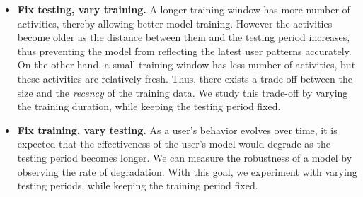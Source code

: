 \begin{itemize}
  \renewcommand{\labelitemi}{$\bullet$}
\item\textbf{Fix testing, vary training.}  A longer training window has
  more number of activities, thereby allowing better model training. 
 However the activities become older as the
  distance between them and the testing period increases, thus preventing the model from reflecting the latest user patterns accurately.  On the
  other hand, a small training window has less number of activities,
  but these activities are relatively fresh.  Thus, there exists a
  trade-off between the size and the \textit{recency} of the training data.
  We study this trade-off by varying the training duration, while
  keeping the testing period fixed.
\item\textbf{Fix training, vary testing.}  As a user's behavior
  evolves over time, it is expected that the effectiveness of the
  user's model would degrade as the testing period becomes longer.  We
  can measure the robustness of a model by observing the rate of
  degradation.  With this goal, we experiment with varying testing
  periods, while keeping the training period fixed.
\end{itemize}




